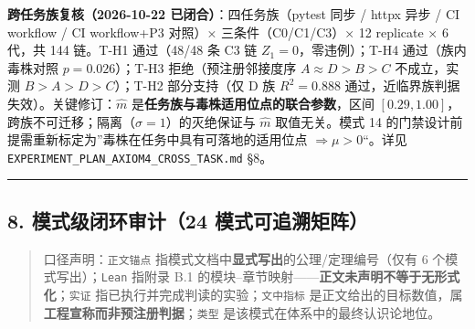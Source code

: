 \textbf{跨任务族复核（2026-10-22 已闭合）}：四任务族（pytest 同步 /
httpx 异步 / CI workflow / CI workflow+P3 对照）× 三条件（C0/C1/C3）× 12
replicate × 6 代，共 144 链。T-H1 通过（48/48 条 C3 链
\(Z_1=0\)，零违例）；T-H4 通过（族内毒株对照 \(p=0.026\)）；T-H3
拒绝（预注册邻接度序 \(A\approx D>B>C\) 不成立，实测 \(B>A>D>C\)）；T-H2
部分支持（仅 D 族 \(R^2=0.888\)
通过，近临界族判据失效）。关键修订：\(\hat m\)
是\textbf{任务族与毒株适用位点的联合参数}，区间
\([0.29,1.00]\)，跨族不可迁移；隔离（\(\sigma=1\)）的灭绝保证与
\(\hat m\) 取值无关。模式 14
的门禁设计前提需重新标定为''毒株在任务中具有可落地的适用位点
\(\Rightarrow \mu>0\)``。详见
\texttt{EXPERIMENT\_PLAN\_AXIOM4\_CROSS\_TASK.md} §8。

\begin{center}\rule{0.5\linewidth}{0.5pt}\end{center}

\subsection{8. 模式级闭环审计（24
模式可追溯矩阵）}\label{ux6a21ux5f0fux7ea7ux95edux73afux5ba1ux8ba124-ux6a21ux5f0fux53efux8ffdux6eafux77e9ux9635}

\begin{quote}
口径声明：\texttt{正文锚点}
指模式文档中\textbf{显式写出}的公理/定理编号（仅有 6
个模式写出）；\texttt{Lean} 指附录 B.1
的模块--章节映射------\textbf{正文未声明不等于无形式化}；\texttt{实证}
指已执行并完成判读的实验；\texttt{文中指标}
是正文给出的目标数值，属\textbf{工程宣称而非预注册判据}；\texttt{类型}
是该模式在体系中的最终认识论地位。
\end{quote}

